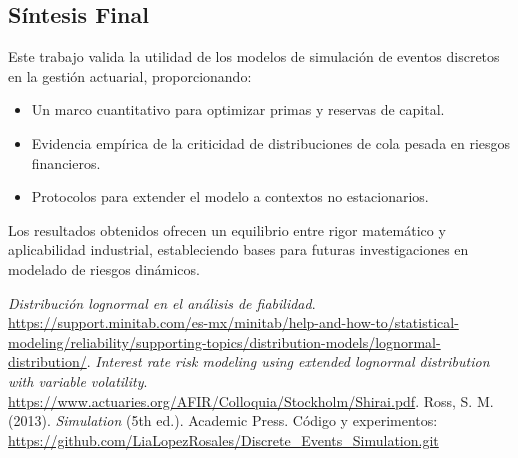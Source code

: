 \documentclass{article}
\begin{document}
\subsection{Síntesis Final}
Este trabajo valida la utilidad de los modelos de simulación de eventos discretos en la gestión actuarial, proporcionando:
\begin{itemize}
    \item Un marco cuantitativo para optimizar primas y reservas de capital.
    \item Evidencia empírica de la criticidad de distribuciones de cola pesada en riesgos financieros.
    \item Protocolos para extender el modelo a contextos no estacionarios.
\end{itemize}
Los resultados obtenidos ofrecen un equilibrio entre rigor matemático y aplicabilidad industrial, estableciendo bases para futuras investigaciones en modelado de riesgos dinámicos.

\begin{thebibliography}{9}
     \textit{Distribución lognormal en el análisis de fiabilidad}. \url{https://support.minitab.com/es-mx/minitab/help-and-how-to/statistical-modeling/reliability/supporting-topics/distribution-models/lognormal-distribution/}.
     \textit{Interest rate risk modeling using extended lognormal
    distribution with variable volatility}.  \url{https://www.actuaries.org/AFIR/Colloquia/Stockholm/Shirai.pdf}.
     Ross, S. M. (2013). \textit{Simulation} (5th ed.). Academic Press.
     Código y experimentos: \url{https://github.com/LiaLopezRosales/Discrete_Events_Simulation.git}
    \end{thebibliography}
\end{document}
